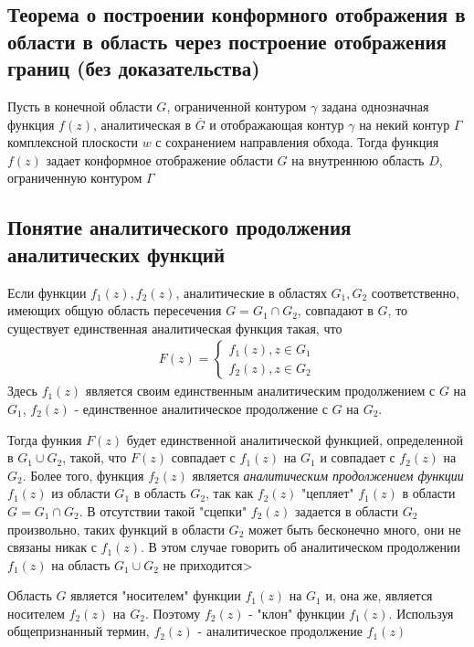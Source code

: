 \documentclass[12pt]{extarticle}
\begin{document}
\subsection{Теорема о построении конформного отображения в области в
область через построение отображения границ (без доказательства)}
Пусть в конечной области $G$, ограниченной контуром $\gamma$ задана
однозначная функция $f(z)$, аналитическая в $\overline{G}$ и
отображающая контур $\gamma$ на некий контур $\Gamma$ комплексной
плоскости $w$ с сохранением направления обхода. Тогда функция $f(z)$
задает конформное отображение области $G$ на внутреннюю область $D$,
ограниченную контуром $\Gamma$

\subsection{Понятие аналитического продолжения аналитических функций}
Если функции $f_{1}(z), f_{2}(z)$, аналитические в областях
$G_{1},G_{2}$ соответственно, имеющих общую область пересечения
$G=G_{1}\cap G_{2}$, совпадают в $G$, то существует единственная
аналитическая функция такая, что
\begin{eqnarray*}
    F(z)=\left\{\begin{aligned}
            f_{1}(z),z\in G_{1}\\
            f_{2}(z),z\in G_{2}
    \end{aligned} \right.
\end{eqnarray*}
Здесь $f_{1}(z)$ является своим единственным аналитическим продолжением
с $G$ на $G_{1}$, $f_{2}(z)$ - единственное аналитическое продолжение с
$G$ на $G_{2}$.
\par Тогда функия $F(z)$ будет единственной аналитической функцией,
определенной в $G_{1}\cup G_{2}$, такой, что $F(z)$ совпадает с
$f_{1}(z)$ на $G_{1}$ и совпадает с $f_{2}(z)$ на $G_{2}$. Более того,
функция $f_{2}(z)$ является \textit{аналитическим продолжением функции}
$f_{1}(z)$ из области $G_{1}$ в область $G_{2}$, так как $f_{2}(z)$
"цепляет" $f_{1}(z)$ в области $G=G_{1}\cap G_{2}$. В отсутствии такой
"сцепки" $f_{2}(z)$ задается в области $G_{2}$ произвольно, таких
функций в области $G_{2}$ может быть бесконечно много, они не связаны
никак с $f_{1}(z)$. В этом случае говорить об аналитическом продолжении
$f_{1}(z)$ на область $G_{1}\cup G_{2}$ не приходится>
\par Область $G$ является "носителем" функции $f_{1}(z)$ на $G_{1}$ и,
она же, является носителем $f_{2}(z)$ на $G_{2}$. Поэтому $f_{2}(z)$ -
"клон" функции $f_{1}(z)$. Используя общепризнанный термин, $f_{2}(z)$ -
аналитическое продолжение $f_{1}(z)$
\end{document}
